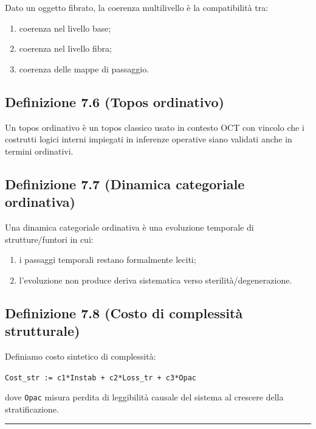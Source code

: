 Dato un oggetto fibrato, la coerenza multilivello è la compatibilità tra:

\begin{enumerate}
\def\labelenumi{\arabic{enumi}.}
\tightlist
\item
  coerenza nel livello base;
\item
  coerenza nel livello fibra;
\item
  coerenza delle mappe di passaggio.
\end{enumerate}

\subsection{Definizione 7.6 (Topos ordinativo)}

Un topos ordinativo è un topos classico usato in contesto OCT con vincolo che i costrutti logici interni impiegati in inferenze operative siano validati anche in termini ordinativi.

\subsection{Definizione 7.7 (Dinamica categoriale ordinativa)}

Una dinamica categoriale ordinativa è una evoluzione temporale di strutture/funtori in cui:

\begin{enumerate}
\def\labelenumi{\arabic{enumi}.}
\tightlist
\item
  i passaggi temporali restano formalmente leciti;
\item
  l'evoluzione non produce deriva sistematica verso sterilità/degenerazione.
\end{enumerate}

\subsection{Definizione 7.8 (Costo di complessità strutturale)}

Definiamo costo sintetico di complessità:

\texttt{Cost\_str\ :=\ c1*Instab\ +\ c2*Loss\_tr\ +\ c3*Opac}

dove \texttt{Opac} misura perdita di leggibilità causale del sistema al crescere della stratificazione.

\begin{center}\rule{0.5\linewidth}{0.5pt}\end{center}

